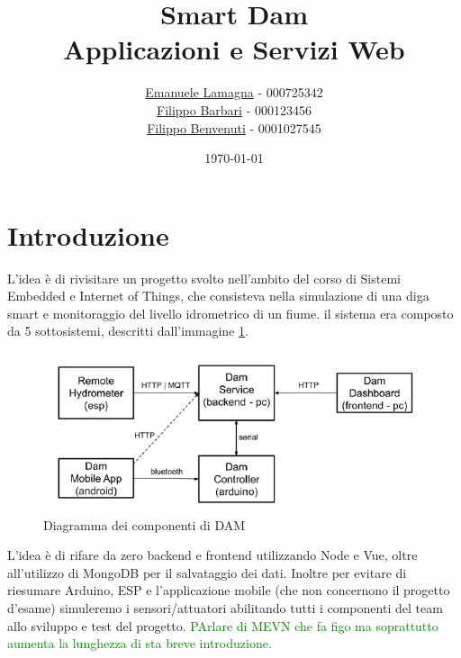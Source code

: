 \documentclass{article}
\title{
    Smart Dam \\
    \large Applicazioni e Servizi Web
}
\author{\href{mailto:emalama@studio.unibo.it}{Emanuele Lamagna} - 000725342\\\href{mailto:filippo.barbari@studio.unibo.it}{Filippo Barbari} - 000123456\\\href{mailto:filippo.benvenuti3@studio.unibo.it}{Filippo Benvenuti} - 0001027545}
\date{\today}
\begin{document}
\maketitle
\section*{Introduzione}\label{sec:intro}
L'idea è di rivisitare un progetto svolto nell'ambito del corso di Sistemi Embedded e Internet of Things, che consisteva nella simulazione di una diga smart e monitoraggio del livello idrometrico di un fiume. il sistema era composto da 5 sottosistemi, descritti dall'immagine \ref{fig:dam-scheme}.
\begin{figure}[h!]
	\centering
	\includegraphics[scale=0.7]{dam-scheme.png}
	\caption{Diagramma dei componenti di DAM}
	\label{fig:dam-scheme}
\end{figure}
L'idea è di rifare da zero backend e frontend utilizzando Node e Vue, oltre all'utilizzo di MongoDB per il salvataggio dei dati. Inoltre per evitare di riesumare Arduino, ESP e l'applicazione mobile (che non concernono il progetto d'esame) simuleremo i sensori/attuatori abilitando tutti i componenti del team allo sviluppo e test del progetto.
\textcolor{green}{PArlare di MEVN che fa figo ma soprattutto aumenta la lunghezza di sta breve introduzione.}
\end{document}
